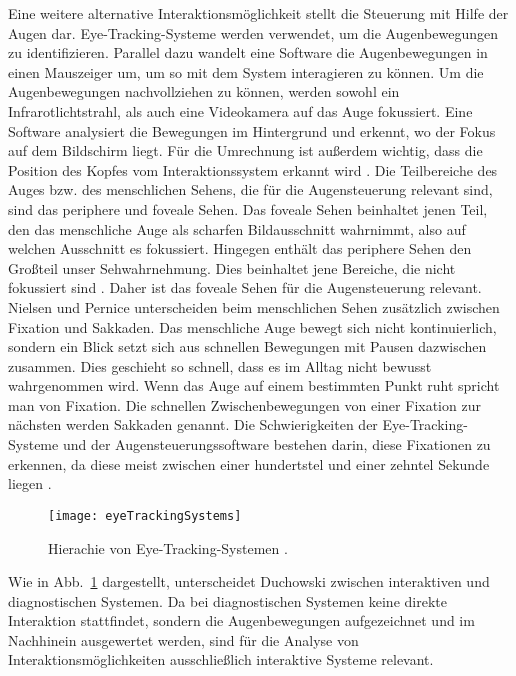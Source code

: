 Eine weitere alternative Interaktionsmöglichkeit stellt die Steuerung mit Hilfe der Augen dar. Eye-Tracking-Systeme werden verwendet, um die Augenbewegungen zu identifizieren. Parallel dazu wandelt eine Software die Augenbewegungen in einen Mauszeiger um, um so mit dem System interagieren zu können. 
\newline \newline
Um die Augenbewegungen nachvollziehen zu können, werden sowohl ein Infrarotlichtstrahl, als auch eine Videokamera auf das Auge fokussiert. Eine Software analysiert die Bewegungen im Hintergrund und erkennt, wo der Fokus auf dem Bildschirm liegt. Für die Umrechnung ist außerdem wichtig, dass die Position des Kopfes vom Interaktionssystem erkannt wird \cite{NielsenPernice}.
\newline \newline
Die Teilbereiche des Auges bzw. des menschlichen Sehens, die für die Augensteuerung relevant sind, sind das periphere und foveale Sehen. Das foveale Sehen beinhaltet jenen Teil, den das menschliche Auge als scharfen Bildausschnitt wahrnimmt, also auf welchen Ausschnitt es fokussiert. Hingegen enthält das periphere Sehen den Großteil unser Sehwahrnehmung. Dies beinhaltet jene Bereiche, die nicht fokussiert sind \cite{NielsenPernice}. Daher ist das foveale Sehen für die Augensteuerung relevant.
\newline \newline
Nielsen und Pernice \cite{NielsenPernice} unterscheiden beim menschlichen Sehen zusätzlich zwischen Fixation und Sakkaden. Das menschliche Auge bewegt sich nicht kontinuierlich, sondern ein Blick setzt sich aus schnellen Bewegungen mit Pausen dazwischen zusammen. Dies geschieht so schnell, dass es im Alltag nicht bewusst wahrgenommen wird. Wenn das Auge auf einem bestimmten Punkt ruht spricht man von Fixation. Die schnellen Zwischenbewegungen von einer Fixation zur nächsten werden Sakkaden genannt. Die Schwierigkeiten der Eye-Tracking-Systeme und der Augensteuerungssoftware bestehen darin, diese Fixationen zu erkennen, da diese meist zwischen einer hundertstel und einer zehntel Sekunde liegen \cite{NielsenPernice}.
\begin{figure}
\centering
\texttt{[image: eyeTrackingSystems]}
\caption{Hierachie von Eye-Tracking-Systemen \cite{Duchowski}.}
\label{fig:eyeTrackingSystems}
\end{figure}
\newline \newline
Wie in Abb.~\ref{fig:eyeTrackingSystems} dargestellt, unterscheidet Duchowski \cite{Duchowski} zwischen interaktiven und diagnostischen Systemen. Da bei diagnostischen Systemen keine direkte Interaktion stattfindet, sondern die Augenbewegungen aufgezeichnet und im Nachhinein ausgewertet werden, sind für die Analyse von Interaktionsmöglichkeiten ausschließlich interaktive Systeme relevant. 
